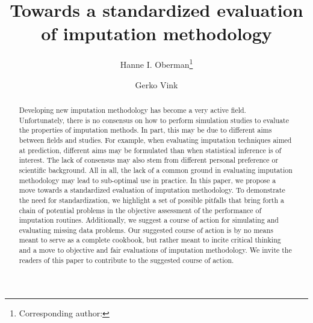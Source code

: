 \documentclass[bimj,fleqn]{w-art}
\begin{document}
\keywords{Evaluation; Imputation; Missing data; Simulation studies;\\ [1pc]
\noindent \hspace*{-4pc} Supporting Information for this article is available from \underline{www.gerkovink.com/evaluation}.\\
}  %

\title[Towards a standardized evaluation of imputation methodology]{Towards a standardized evaluation of imputation methodology}
\author[Oberman]{Hanne I. Oberman\footnote{Corresponding author: {}}} 
\address[\inst{1}]{Departement of Methodology \& Statistics, Padualaan 14, 3584 CH Utrecht, The Netherlands}
\author[Vink]{Gerko Vink}
   

\begin{abstract}
Developing new imputation methodology has become a very active field. Unfortunately, there is no consensus on how to perform simulation studies to evaluate the properties of imputation methods. In part, this may be due to different aims between fields and studies. For example, when evaluating imputation techniques aimed at prediction, different aims may be formulated than when statistical inference is of interest. The lack of consensus may also stem from different personal preference or scientific background. All in all, the lack of a common ground in evaluating imputation methodology may lead to sub-optimal use in practice. In this paper, we propose a move towards a standardized evaluation of imputation methodology. To demonstrate the need for standardization, we highlight a set of possible pitfalls that bring forth a chain of potential problems in the objective assessment of the performance of imputation routines.  Additionally, we suggest a course of action for simulating and evaluating missing data problems. Our suggested course of action is by no means meant to serve as a complete cookbook, but rather meant to incite critical thinking and a move to objective and fair evaluations of imputation methodology. We invite the readers of this paper to contribute to the suggested course of action.
\end{abstract}
\end{document}
